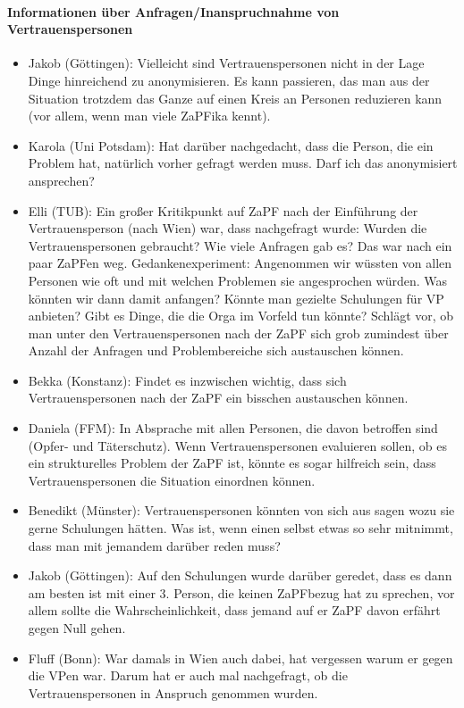     \paragraph{Informationen über Anfragen/Inanspruchnahme von Vertrauenspersonen}
      \begin{itemize}
        \item Jakob (Göttingen): Vielleicht sind Vertrauenspersonen nicht in der Lage Dinge hinreichend zu anonymisieren. Es kann passieren, das man aus der Situation trotzdem das Ganze auf einen Kreis an Personen reduzieren kann (vor allem, wenn man viele ZaPFika kennt).
        \item Karola (Uni Potsdam): Hat darüber nachgedacht, dass die Person, die ein Problem hat, natürlich vorher gefragt werden muss. Darf ich das anonymisiert ansprechen?
        \item Elli (TUB): Ein großer Kritikpunkt auf ZaPF nach der Einführung der Vertrauensperson (nach Wien) war, dass nachgefragt wurde: Wurden die Vertrauenspersonen gebraucht? Wie viele Anfragen gab es? Das war nach ein paar ZaPFen weg. Gedankenexperiment: Angenommen wir wüssten von allen Personen wie oft und mit welchen Problemen sie angesprochen würden. Was könnten wir dann damit anfangen? Könnte man gezielte Schulungen für VP anbieten? Gibt es Dinge, die die Orga im Vorfeld tun könnte? Schlägt vor, ob man unter den Vertrauenspersonen nach der ZaPF sich grob zumindest über Anzahl der Anfragen und Problembereiche sich austauschen können.
        \item Bekka (Konstanz): Findet es inzwischen wichtig, dass sich Vertrauenspersonen nach der ZaPF ein bisschen austauschen können.
        \item Daniela (FFM): In Absprache mit allen Personen, die davon betroffen sind (Opfer- und Täterschutz). Wenn Vertrauenspersonen evaluieren sollen, ob es ein strukturelles Problem der ZaPF ist, könnte es sogar hilfreich sein, dass Vertrauenspersonen die Situation einordnen können.
        \item Benedikt (Münster): Vertrauenspersonen könnten von sich aus sagen wozu sie gerne Schulungen hätten. Was ist, wenn einen selbst etwas so sehr mitnimmt, dass man mit jemandem darüber reden muss?
        \item Jakob (Göttingen): Auf den Schulungen wurde darüber geredet, dass es dann am besten ist mit einer 3. Person, die keinen ZaPFbezug hat zu sprechen, vor allem sollte die Wahrscheinlichkeit, dass jemand auf er ZaPF davon erfährt gegen Null gehen.
        \item Fluff (Bonn): War damals in Wien auch dabei, hat vergessen warum er gegen die VPen war. Darum hat er auch mal nachgefragt, ob die Vertrauenspersonen in Anspruch genommen wurden.

\end{itemize}
